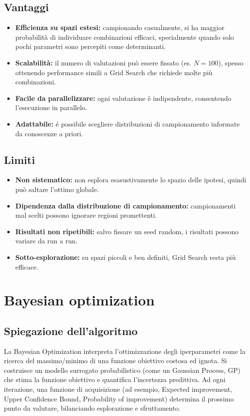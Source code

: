 \documentclass[a4paper,12pt]{report}
\begin{document}
	\subsection{Vantaggi}
	\begin{itemize}
		\item \textbf{Efficienza su spazi estesi:} campionando casualmente, si ha maggior probabilità di individuare combinazioni efficaci, specialmente quando solo pochi parametri sono percepiti come determinanti.
		\item \textbf{Scalabilità:} il numero di valutazioni può essere fissato (es. $N=100$), spesso ottenendo performance simili a Grid Search che richiede molte più combinazioni.
		\item \textbf{Facile da parallelizzare:} ogni valutazione è indipendente, consentendo l’esecuzione in parallelo.
		\item \textbf{Adattabile:} é possibile scegliere distribuzioni di campionamento informate da conoscenze a priori.
	\end{itemize}
	
	\subsection{Limiti}
	\begin{itemize}
		\item \textbf{Non sistematico:} non esplora esasustivamente lo spazio delle ipotesi, quindi può saltare l’ottimo globale.
		\item \textbf{Dipendenza dalla distribuzione di campionamento:} campionamenti mal scelti possono ignorare regioni promettenti.
		\item \textbf{Risultati non ripetibili:} salvo fissare un seed random, i risultati possono variare da run a run.
		\item \textbf{Sotto-esplorazione:} su spazi piccoli e ben definiti, Grid Search resta più efficace.
	\end{itemize}
	
	\section{Bayesian optimization}
	
	\subsection{Spiegazione dell'algoritmo}
	La Bayesian Optimization interpreta l’ottimizzazione degli iperparametri come la ricerca del massimo/minimo di una funzione obiettivo costosa ed ignota. Si costruisce un modello surrogato probabilistico (come un Gaussian Process, GP) che stima la funzione obiettivo e quantifica l’incertezza predittiva. Ad ogni iterazione, una funzione di acquisizione (ad esempio, Expected improvement, Upper Confidence Bound, Probability of improvement) determina il prossimo punto da valutare, bilanciando esplorazione e sfruttamento.
	
\end{document}
